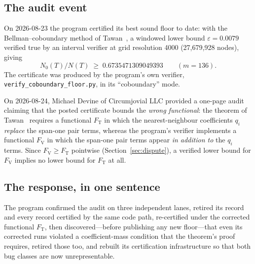 \documentclass[11pt]{article}
\newcommand{\eps}{\varepsilon}
\newcommand{\Fv}{F_{\mathrm{V}}}
\newcommand{\Ft}{F_{\mathrm{T}}}
\begin{document}
\subsection{The audit event}
\label{sec:audit-event}

On 2026-08-23 the program certified its best sound floor to date: with the
Bellman--coboundary method of Tawan~\cite{tawanerguo}, a windowed lower bound
$\eps = 0.0079$ verified true by an interval verifier at grid resolution 4000
(27{,}679{,}928 nodes), giving
\[
N_0(T)/N(T) \;\ge\; 0.6735471309049393 \qquad (m = 136). %
\]
The certificate was produced by the program's own verifier,
\texttt{verify\_coboundary\_floor.py}, in its ``coboundary'' mode.

On 2026-08-24, Michael Devine of Circumjovial LLC provided a one-page audit
claiming that the posted certificate bounds the \emph{wrong functional}: the
theorem of Tawan~\cite{tawanerguo} requires a functional $\Ft$ in which the
nearest-neighbour coefficients $q_i$ \emph{replace} the span-one pair terms,
whereas the program's verifier implements a functional $\Fv$ in which the
span-one pair terms appear \emph{in addition to} the $q_i$ terms. Since
$\Fv \ge \Ft$ pointwise (Section~\ref{sec:dispute}), a verified lower bound for
$\Fv$ implies no lower bound for $\Ft$ at all.

\subsection{The response, in one sentence}
The program confirmed the audit on three independent lanes, retired its record
and every record certified by the same code path, re-certified under the
corrected functional $\Ft$, then discovered---before publishing any new
floor---that even its corrected runs violated a coefficient-mass condition that
the theorem's proof requires, retired those too, and rebuilt its certification
infrastructure so that both bug classes are now unrepresentable.
\end{document}
